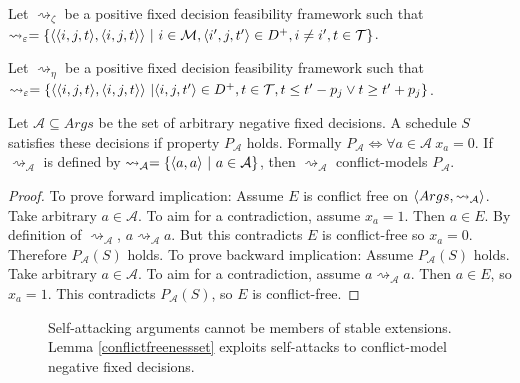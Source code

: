 \begin{definition}
	Let $\rightsquigarrow_\zeta$ be a positive fixed decision feasibility framework such that
	$\rightsquigarrow_\varepsilon=\{\pair{\triple{i}{j}{t}}{\triple{i}{j}{t}}\ |\ i\in\mathcal{M}, \triple{i'}{j}{t'}\in D^+, i\neq i', t\in\mathcal{T}\}$.
\end{definition}

\begin{definition}
	Let $\rightsquigarrow_\eta$ be a positive fixed decision feasibility framework such that
	$\rightsquigarrow_\varepsilon=\{\pair{\triple{i}{j}{t}}{\triple{i}{j}{t}}\ |\triple{i}{j}{t'}\in D^+, t\in\mathcal{T}, t\leq t'-p_j\lor t\geq t'+p_j\}$.
\end{definition}

\begin{lemma}
	\label{conflictfreenessset}
	Let $\mathcal{A}\subseteq Args$ be the set of arbitrary negative fixed decisions. A schedule $S$ satisfies these decisions if property $P_\mathcal{A}$ holds. Formally $P_\mathcal{A}\iff\forall a\in\mathcal{A}\ x_a=0$. If $\rightsquigarrow_\mathcal{A}$ is defined by $\rightsquigarrow_\mathcal{A}=\{\pair{a}{a}\ |\ a\in\mathcal{A}\}$, then $\rightsquigarrow_\mathcal{A}$ conflict-models $P_\mathcal{A}$.

	\begin{proof}
		To prove forward implication: Assume $E$ is conflict free on $\langle{Args},{\rightsquigarrow_\mathcal{A}}\rangle$. Take arbitrary $a\in\mathcal{A}$. To aim for a contradiction, assume $x_a=1$. Then $a\in E$. By definition of $\rightsquigarrow_\mathcal{A}$, $a\rightsquigarrow_\mathcal{A} a$. But this contradicts $E$ is conflict-free so $x_a=0$. Therefore $P_\mathcal{A}(S)$ holds.
		\linespace
		To prove backward implication: Assume $P_\mathcal{A}(S)$ holds. Take arbitrary $a\in\mathcal{A}$. To aim for a contradiction, assume $a\rightsquigarrow_\mathcal{A}a$. Then $a\in E$, so $x_a=1$. This contradicts $P_\mathcal{A}(S)$, so $E$ is conflict-free.
	\end{proof}
\end{lemma}

\begin{figure}[H]
	\centering
	\caption{Self-attacking arguments cannot be members of stable extensions. Lemma \ref{conflictfreenessset} exploits self-attacks to conflict-model negative fixed decisions.}
\end{figure}

